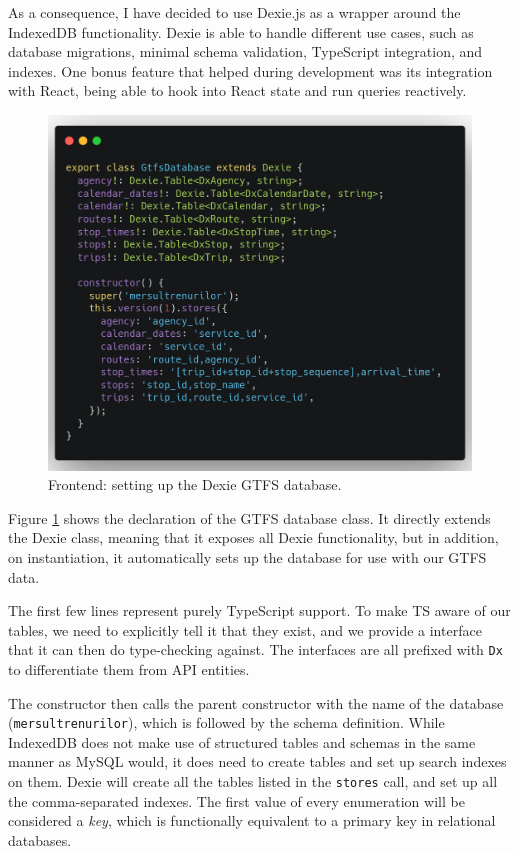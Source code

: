 As a consequence, I have decided to use Dexie.js as a wrapper around the IndexedDB functionality. Dexie is able to handle different use cases, such as database migrations, minimal schema validation, TypeScript integration, and indexes. One bonus feature that helped during development was its integration with React, being able to hook into React state and run queries reactively.

\begin{figure}[htbp]
    \centering
    \includegraphics[width=.8\textwidth]{./figures/code/fe_dexie-gtfs.png}
    \caption{Frontend: setting up the Dexie GTFS database.}
    \label{FigFeDexieGTFS}
\end{figure}

Figure \ref{FigFeDexieGTFS} shows the declaration of the GTFS database class. It directly extends the Dexie class, meaning that it exposes all Dexie functionality, but in addition, on instantiation, it automatically sets up the database for use with our GTFS data.

The first few lines represent purely TypeScript support. To make TS aware of our tables, we need to explicitly tell it that they exist, and we provide a interface that it can then do type-checking against. The interfaces are all prefixed with \verb|Dx| to differentiate them from API entities.

The constructor then calls the parent constructor with the name of the database (\verb|mersultrenurilor|), which is followed by the schema definition. While Indexed\-DB does not make use of structured tables and schemas in the same manner as MySQL would, it does need to create tables and set up search indexes on them. Dexie will create all the tables listed in the \verb|stores| call, and set up all the comma-separated indexes. The first value of every enumeration will be considered a \textit{key}, which is functionally equivalent to a primary key in relational databases.

